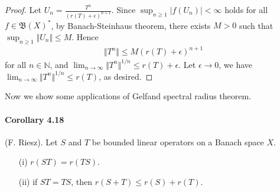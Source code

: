 \documentclass{article}
\begin{document}
\begin{proof}
Let $U_n = \frac{T^n}{(r(T)+\epsilon)^{n+1}}$. Since $\sup_{n\geq 1}\vert f(U_n)\vert<\infty$ holds for all $f\in\mathfrak{B}(X)^*$, by Banach-Steinhaus theorem, there exists $M>0$ such that $\sup_{n\geq 1}\Vert U_n\Vert \leq M$. Hence
\begin{align*}
	\Vert T^n\Vert\leq M\left(r(T)+\epsilon\right)^{n+1}
\end{align*}
for all $n\in\mathbb{N}$, and $\lim_{n\to\infty}\Vert T^n\Vert^{1/n}\leq r(T)+\epsilon$. Let $\epsilon\to 0$, we have $\lim_{n\to\infty}\Vert T^n\Vert^{1/n}\leq r(T)$, as desired.
\end{proof}

Now we show some applications of Gelfand spectral radius theorem.
\paragraph{Corollary 4.18\label{cor:4.18}} (F. Riesz). Let $S$ and $T$ be bounded linear operators on a Banach space $X$.
\begin{itemize}
	\vspace{0.1cm}
	\item[(i)] $r(ST)=r(TS)$. 
	\vspace{0.1cm}
	\item[(ii)] if $ST=TS$, then $r(S+T)\leq r(S)+r(T)$.
\end{itemize} 
\end{document}
